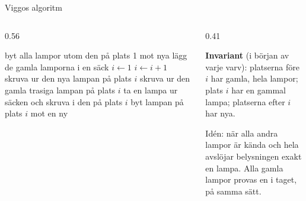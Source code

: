 \begin{frame}{Viggos algoritm}
\begin{columns}[T]
\begin{column}{0.56\textwidth}
\footnotesize
\begin{algorithmic}[1]
\State byt alla lampor utom den på plats 1 mot nya
\State lägg de gamla lamporna i en säck
\State $i\gets1$
    \State $i\gets i+1$
    \State skruva ur den nya lampan på plats $i$
  \Else
    \State skruva ur den gamla trasiga lampan på plats $i$
  \EndIf
  \State ta en lampa ur säcken och skruva i den på plats $i$
\EndWhile
{}
  \State byt lampan på plats $i$ mot en ny
\EndIf
\end{algorithmic}
\end{column}
\begin{column}{0.41\textwidth}
\begin{infobox}[fontupper=\footnotesize]
\textbf{Invariant} (i början av varje varv): platserna före $i$ har gamla, hela lampor;
plats $i$ har en gammal lampa; platserna efter $i$ har nya.
\end{infobox}
\begin{ahabox}[fontupper=\footnotesize]
Idén: när alla andra lampor är kända och hela avslöjar belysningen exakt en lampa. Alla
gamla lampor provas en i taget, på samma sätt.
\end{ahabox}
\end{column}
\end{columns}
\end{frame}



